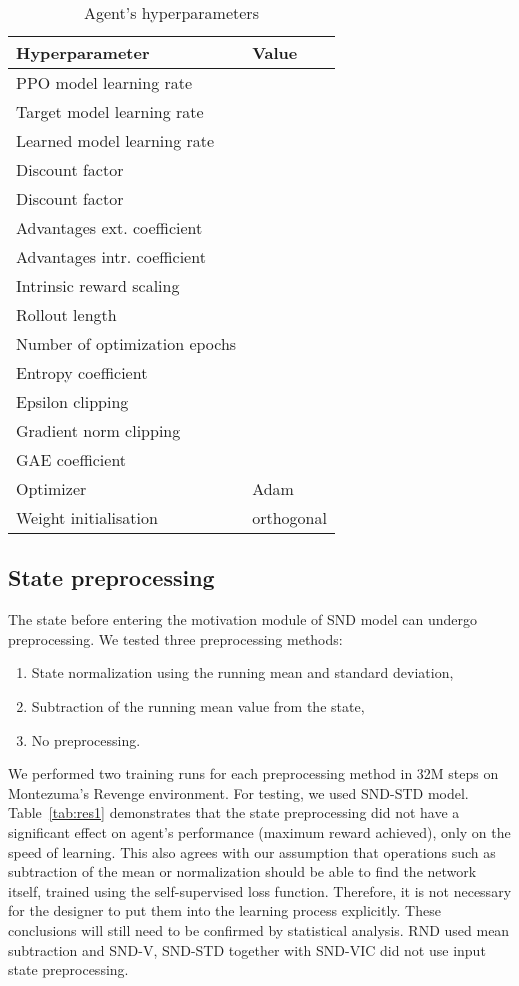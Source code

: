 \documentclass[a4paper,11pt]{elsarticle}
\begin{document}
\begin{table}[thb]
\scriptsize
\centering
\caption{Agent's hyperparameters}
    \begin{tabular}{l|l}
        Hyperparameter & Value \\ 
        \hline\hline
        PPO model learning rate &  \\
        Target model  learning rate &  \\
        Learned model  learning rate &  \\
        Discount factor  &  \\
        Discount factor  &  \\
        Advantages ext. coefficient &  \\
        Advantages intr. coefficient &  \\
        Intrinsic reward scaling &  \\
        Rollout length &  \\ 
        Number of optimization epochs &  \\
        Entropy coefficient &  \\
        Epsilon clipping &  \\
        Gradient norm clipping &  \\
        GAE  coefficient &  \\
        Optimizer & Adam \\
        Weight initialisation & orthogonal \\
        \hline
    \end{tabular}
    \label{tab:agent_hyperparameters}
\end{table}

\subsection{State preprocessing}
\label{sec:exp2}

The state before entering the motivation module of SND model can undergo preprocessing. We tested three preprocessing methods:
\begin{enumerate}
\item State normalization using the running mean and standard deviation, 
\item Subtraction of the running mean value from the state, 
\item No preprocessing.
\end{enumerate}

We performed two training runs for each preprocessing method in 32M steps on Montezuma's Revenge environment. For testing, we used SND-STD model. Table~\ref{tab:res1} demonstrates that the state preprocessing did not have a significant effect on agent's performance (maximum reward achieved), only on the speed of learning. This also agrees with our assumption that operations such as subtraction of the mean or normalization should be able to find the network itself, trained using the self-supervised loss function. Therefore, it is not necessary for the designer to put them into the learning process explicitly. These conclusions will still need to be confirmed by statistical analysis. RND used mean subtraction and SND-V, SND-STD together with SND-VIC did not use input state preprocessing.
\end{document}
